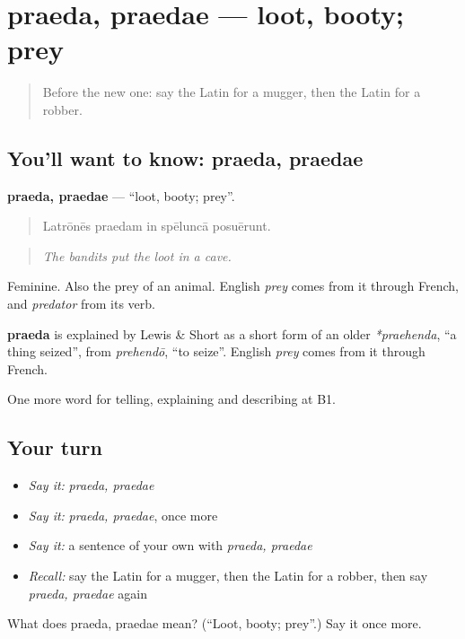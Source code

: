 \section[praeda, praedae]{praeda, praedae — loot, booty; prey}

\label{lesson:LA-C303-praeda}



\begin{quote}
Before the new one: say the Latin for a mugger, then the Latin for a robber.
\end{quote}

\subsection*{You'll want to know: praeda, praedae}
\textbf{praeda, praedae} — \textquotedblleft{}loot, booty; prey\textquotedblright{}.

\begin{quote}
Latrōnēs praedam in spēluncā posuērunt.
\end{quote}

\begin{quote}
\emph{The bandits put the loot in a cave.}
\end{quote}

Feminine. Also the prey of an animal. English \emph{prey} comes from it through French, and \emph{predator} from its verb.

\begin{cousinweb}
\textbf{praeda} is explained by Lewis \& Short as a short form of an older \emph{*praehenda}, \textquotedblleft{}a thing seized\textquotedblright{}, from \emph{prehendō}, \textquotedblleft{}to seize\textquotedblright{}. English \emph{prey} comes from it through French.
\end{cousinweb}

\begin{grammarlens}[title={What you've built}]
One more word for telling, explaining and describing at B1.
\end{grammarlens}

\subsection*{Your turn}
\begin{itemize}
\raggedright
  \item \emph{Say it:} \emph{praeda, praedae}
  \item \emph{Say it:} \emph{praeda, praedae}, once more
  \item \emph{Say it:} a sentence of your own with \emph{praeda, praedae}
  \item \emph{Recall:} say the Latin for a mugger, then the Latin for a robber, then say \emph{praeda, praedae} again
\end{itemize}

\begin{tcolorbox}[breakable,colback=teal!4,colframe=teal!35!black,title={Before you move on}]
What does praeda, praedae mean? (\textquotedblleft{}Loot, booty; prey\textquotedblright{}.) Say it once more.
\end{tcolorbox}
